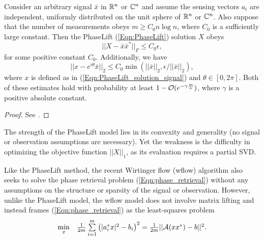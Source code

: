 \begin{theorem}  \label{Thm:PhaseLift_approx}
Consider an arbitrary signal $\bar{x}$ in ${\mathbb R}^n$ or ${\mathbb C}^n$ and assume the sensing vectors $a_i$ are independent, uniformly distributed on the unit sphere of ${\mathbb R}^n$ or ${\mathbb C}^n$.  Also suppose that the number of measurements obeys $m \geq C_0 n \log n $, where $C_0$ is a sufficiently large constant.  Then the PhaseLift (\ref{Eqn:PhaseLift}) solution $X$ obeys
\begin{equation}				\label{Eqn:Thm_PhaseLift_approx_X}
||X - \bar{x}\bar{x}^*||_F \leq C_0 \epsilon,
\end{equation}
for some positive constant $C_0$.  Additionally, we have
\begin{equation}		\label{Eqn:Thm_PhaseLift_approx_x}
||x - e^{i \theta}\bar{x}||_2 \leq C_0 \min(||\bar{x}||_2, \epsilon / ||\bar{x}||_2),
\end{equation}
where $x$ is defined as in (\ref{Eqn:PhaseLift_solution_signal}) and $\theta \in [0, 2\pi]$.
Both of these estimates hold with probability at least $1 - {\mathcal O}(e^{-\gamma \frac{m}{n}})$, where $\gamma$ is a positive absolute constant.
\end{theorem}
\begin{proof}
See \cite[Section 6]{candes2013phaselift}.
\end{proof}


The strength of the PhaseLift model lies in its convexity and generality (no signal or observation assumptions are necessary).  Yet the weakness is the difficulty in optimizing the objective function $||X||_1$, as its evaluation requires a partial SVD.




Like the PhaseLift method, the recent Wirtinger flow (wflow) algorithm \cite{DBLP:journals/tit/CandesLS15} also seeks to solve the phase retrieval problem (\ref{Eqn:phase_retrieval}) without any assumptions on the structure or sparsity of the signal or observation.  However, unlike the PhaseLift model, the wflow model does not involve matrix lifting and instead frames (\ref{Eqn:phase_retrieval}) as the least-squares problem
\begin{equation} 				\label{Eqn:wflow_least-squares}
\begin{array}{ll}
	\min\limits_{\substack{x}}
		&	\frac{1}{2m} \sum\limits_{\substack{i=1}}^{\substack{m}} \left( |a_i^*x|^2 - b_i \right)^2
			= \frac{1}{2m} || {\mathcal A}(xx^*) - b||^2.
\end{array}
\end{equation}


